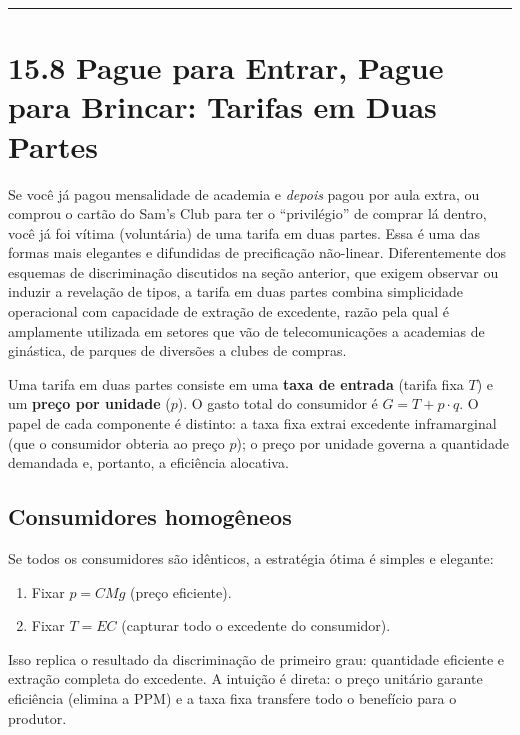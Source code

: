 \documentclass[11pt,twoside,openright]{book}
\providecommand{\tightlist}{\setlength{\itemsep}{0pt}\setlength{\parskip}{0pt}}
\begin{document}
\begin{center}\rule{0.5\linewidth}{0.5pt}\end{center}

\section{15.8 Pague para Entrar, Pague para Brincar: Tarifas em Duas
Partes}\label{158}

Se você já pagou mensalidade de academia e \emph{depois} pagou por aula
extra, ou comprou o cartão do Sam's Club para ter o ``privilégio'' de
comprar lá dentro, você já foi vítima (voluntária) de uma tarifa em duas
partes. Essa é uma das formas mais elegantes e difundidas de
precificação não-linear. Diferentemente dos esquemas de discriminação
discutidos na seção anterior, que exigem observar ou induzir a revelação
de tipos, a tarifa em duas partes combina simplicidade operacional com
capacidade de extração de excedente, razão pela qual é amplamente
utilizada em setores que vão de telecomunicações a academias de
ginástica, de parques de diversões a clubes de compras.

Uma tarifa em duas partes consiste em uma \textbf{taxa de entrada}
(tarifa fixa \(T\)) e um \textbf{preço por unidade} (\(p\)). O gasto
total do consumidor é \(G = T + p \cdot q\). O papel de cada componente
é distinto: a taxa fixa extrai excedente inframarginal (que o consumidor
obteria ao preço \(p\)); o preço por unidade governa a quantidade
demandada e, portanto, a eficiência alocativa.

\subsection{Consumidores homogêneos}\label{consumidores-homoguxeaneos}

Se todos os consumidores são idênticos, a estratégia ótima é simples e
elegante:

\begin{enumerate}
\def\labelenumi{\arabic{enumi}.}
\tightlist
\item
  Fixar \(p = CMg\) (preço eficiente).
\item
  Fixar \(T = EC\) (capturar todo o excedente do consumidor).
\end{enumerate}

Isso replica o resultado da discriminação de primeiro grau: quantidade
eficiente e extração completa do excedente. A intuição é direta: o preço
unitário garante eficiência (elimina a PPM) e a taxa fixa transfere todo
o benefício para o produtor.
\end{document}
